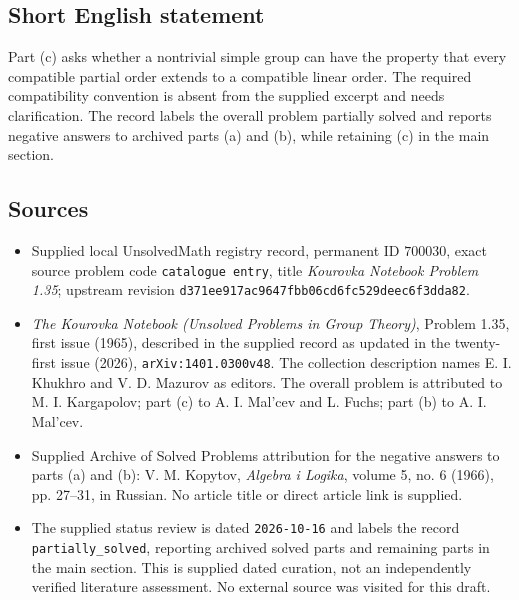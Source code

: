 \documentclass[11pt]{article}
\begin{document}
\subsection{Short English statement}
Part (c) asks whether a nontrivial simple group can have the property that every compatible partial order extends to a compatible linear order. The required compatibility convention is absent from the supplied excerpt and needs clarification. The record labels the overall problem partially solved and reports negative answers to archived parts (a) and (b), while retaining (c) in the main section.
\subsection{Sources}
\begin{itemize}
\item Supplied local UnsolvedMath registry record, permanent ID \(700030\), exact source problem code \texttt{catalogue entry}, title \emph{Kourovka Notebook Problem 1.35}; upstream revision \texttt{d371ee917ac9647fbb06cd6fc529deec6f3dda82}.
\item \emph{The Kourovka Notebook (Unsolved Problems in Group Theory)}, Problem 1.35, first issue (1965), described in the supplied record as updated in the twenty-first issue (2026), \texttt{arXiv:1401.0300v48}. The collection description names E. I. Khukhro and V. D. Mazurov as editors. The overall problem is attributed to M. I. Kargapolov; part (c) to A. I. Mal'cev and L. Fuchs; part (b) to A. I. Mal'cev.
\item Supplied Archive of Solved Problems attribution for the negative answers to parts (a) and (b): V. M. Kopytov, \emph{Algebra i Logika}, volume 5, no. 6 (1966), pp. 27--31, in Russian. No article title or direct article link is supplied.
\item The supplied status review is dated \texttt{2026-10-16} and labels the record \texttt{partially\_solved}, reporting archived solved parts and remaining parts in the main section. This is supplied dated curation, not an independently verified literature assessment. No external source was visited for this draft.
\end{itemize}
\end{document}
